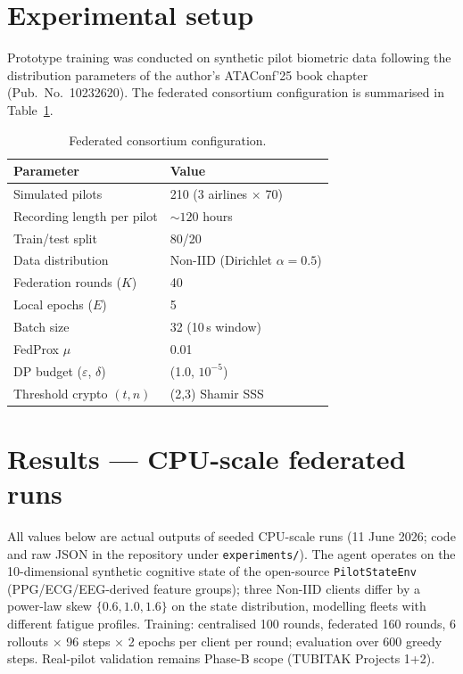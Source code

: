 \documentclass[11pt]{article}
\begin{document}
\section{Experimental setup}
Prototype training was conducted on synthetic pilot biometric data following the distribution parameters of the author's ATAConf'25 book chapter (Pub.\ No.\ 10232620). The federated consortium configuration is summarised in Table~\ref{tab:config}.

\begin{table}[ht]\centering\small
\caption{Federated consortium configuration.}\label{tab:config}
\begin{tabular}{ll}
\toprule
\textbf{Parameter} & \textbf{Value}\\
\midrule
Simulated pilots & 210 (3 airlines $\times$ 70)\\
Recording length per pilot & ${\sim}120$ hours\\
Train/test split & 80/20\\
Data distribution & Non-IID (Dirichlet $\alpha=0.5$)\\
Federation rounds ($K$) & 40\\
Local epochs ($E$) & 5\\
Batch size & 32 (10\,s window)\\
FedProx $\mu$ & 0.01\\
DP budget ($\varepsilon$, $\delta$) & (1.0, $10^{-5}$)\\
Threshold crypto $(t,n)$ & (2,3) Shamir SSS\\
\bottomrule
\end{tabular}
\end{table}

\section{Results --- CPU-scale federated runs}
All values below are actual outputs of seeded CPU-scale runs (11 June 2026; code and raw JSON in the repository under \texttt{experiments/}). The agent operates on the 10-dimensional synthetic cognitive state of the open-source \texttt{PilotStateEnv} (PPG/ECG/EEG-derived feature groups); three Non-IID clients differ by a power-law skew $\{0.6, 1.0, 1.6\}$ on the state distribution, modelling fleets with different fatigue profiles. Training: centralised 100 rounds, federated 160 rounds, 6 rollouts $\times$ 96 steps $\times$ 2 epochs per client per round; evaluation over 600 greedy steps. Real-pilot validation remains Phase-B scope (TUBITAK Projects 1+2).
\end{document}
